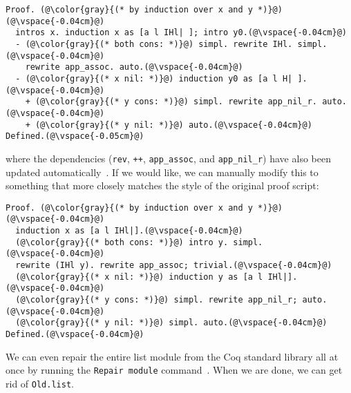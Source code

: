 \begin{lstlisting}[backgroundcolor=\color{cyan!30}]
Proof. (@\color{gray}{(* by induction over x and y *)}@)(@\vspace{-0.04cm}@)
  intros x. induction x as [a l IHl| ]; intro y0.(@\vspace{-0.04cm}@)
  - (@\color{gray}{(* both cons: *)}@) simpl. rewrite IHl. simpl.(@\vspace{-0.04cm}@)
    rewrite app_assoc. auto.(@\vspace{-0.04cm}@)
  - (@\color{gray}{(* x nil: *)}@) induction y0 as [a l H| ].(@\vspace{-0.04cm}@)
    + (@\color{gray}{(* y cons: *)}@) simpl. rewrite app_nil_r. auto.(@\vspace{-0.04cm}@)
    + (@\color{gray}{(* y nil: *)}@) auto.(@\vspace{-0.04cm}@)
Defined.(@\vspace{-0.05cm}@)
\end{lstlisting}
where the dependencies (\lstinline{rev}, \lstinline{++}, \lstinline{app_assoc}, and \lstinline{app_nil_r}) have
also been updated automatically~\href{https://github.com/uwplse/pumpkin-pi/blob/v2.0.0/plugin/coq/Swap.v}{}. %
If we would like, we can manually modify this to something that more closely matches the style of the original proof script:

\begin{lstlisting}
Proof. (@\color{gray}{(* by induction over x and y *)}@)(@\vspace{-0.04cm}@)
  induction x as [a l IHl|].(@\vspace{-0.04cm}@)
  (@\color{gray}{(* both cons: *)}@) intro y. simpl.(@\vspace{-0.04cm}@)
  rewrite (IHl y). rewrite app_assoc; trivial.(@\vspace{-0.04cm}@)
  (@\color{gray}{(* x nil: *)}@) induction y as [a l IHl|].(@\vspace{-0.04cm}@)
  (@\color{gray}{(* y cons: *)}@) simpl. rewrite app_nil_r; auto.(@\vspace{-0.04cm}@)
  (@\color{gray}{(* y nil: *)}@) simpl. auto.(@\vspace{-0.04cm}@)
Defined.(@\vspace{-0.04cm}@)
\end{lstlisting}
We can even repair the entire list module from the Coq standard library all at once by running the \lstinline{Repair module}
command~\href{https://github.com/uwplse/pumpkin-pi/blob/v2.0.0/plugin/coq/Swap.v}{}. %
When we are done, we can get rid of \lstinline{Old.list}. %

